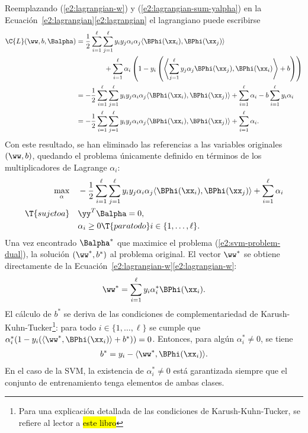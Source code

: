%
Reemplazando (\ref{e2:lagrangian-w}) y
(\ref{e2:lagrangian-sum-yalpha}) en la
\iflatexml{}Ecuación~\ref{e2:lagrangian}\else\autoref{e2:lagrangian}\fi
el lagrangiano puede escribirse
%
\begin{align*}
  \C{L}(\ww,b,\Balpha)
  & = 
    \frac{1}{2}\sum_{i=1}^\ell\sum_{j=1}^\ell y_iy_j\alpha_i\alpha_j
    \langle\BPhi(\xx_i),\BPhi(\xx_j)\rangle \\
    &\qquad\qquad +
    \sum_{i=1}^{\ell} \alpha_i \left(1-y_i\left(\left\langle
    \sum_{j=1}^\ell y_j\alpha_j\BPhi(\xx_j) ,\BPhi(\xx_i)\right\rangle
    +b\right)\right)\\
  & = 
    -\frac{1}{2}\sum_{i=1}^\ell\sum_{j=1}^\ell y_iy_j\alpha_i\alpha_j
    \langle\BPhi(\xx_i),\BPhi(\xx_j)\rangle +
    \sum_{i=1}^{\ell} \alpha_i  - b \sum_{i=1}^\ell y_i\alpha_i \\
 & = 
    -\frac{1}{2}\sum_{i=1}^\ell\sum_{j=1}^\ell y_iy_j\alpha_i\alpha_j
    \langle\BPhi(\xx_i),\BPhi(\xx_j)\rangle +
    \sum_{i=1}^{\ell} \alpha_i  .
\end{align*}
%
Con este resultado, se han eliminado las referencias a las variables
originales $(\ww,b)$, quedando el problema únicamente definido en
términos de los multiplicadores de Lagrange $\alpha_i$:
%
\begin{align}
  \begin{split}
    \max_\alpha &\quad
    -\frac{1}{2}\sum_{i=1}^\ell\sum_{j=1}^\ell y_iy_j\alpha_i\alpha_j
    \langle \BPhi(\xx_i),\BPhi(\xx_j) \rangle +
    \sum_{i=1}^{\ell} \alpha_i \\
    \T{sujeto a} &\quad \yy^T\Balpha = 0, \\
    &\quad \alpha_i \geq 0\T{ para todo } i\in\{1,\ldots,\ell\}.
  \end{split}
  \label{e2:svm-problem-dual2}
\end{align}
%
Una vez encontrado $\Balpha^*$ que maximice el problema
(\ref{e2:svm-problem-dual}), la solución $(\ww^*,b^*)$ al problema
original. El vector $\ww^*$ se obtiene directamente de la
 \iflatexml{}Ecuación~\ref{e2:lagrangian-w}\else\autoref{e2:lagrangian-w}\fi:
%
\begin{align*}
  \ww^* = \sum_{i=1}^\ell y_i\alpha^*_i\BPhi(\xx_i).
\end{align*}
%
El cálculo de $b^*$ se deriva de las condiciones de complementariedad de
Karush-Kuhn-Tucker\footnote{Para una explicación detallada de las
  condiciones de Karush-Kuhn-Tucker, se refiere al lector a
  \hl{este libro}}: para todo $i\in\{1,\ldots,\ell\}$ se cumple que
$\alpha^*_i(1-y_i(\langle\ww^*,\BPhi(\xx_i)\rangle+b^*))=0$. Entonces,
para algún $\alpha^*_i\neq0$, se tiene
%
\begin{align}
  b^* = y_i - \langle\ww^*,\BPhi(\xx_i)\rangle .
\end{align}
%
En el caso de la SVM, la existencia de $\alpha^*_i\neq0$ está
garantizada siempre que el conjunto de entrenamiento tenga elementos
de ambas clases.
